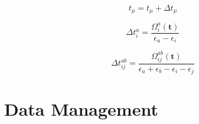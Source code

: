 \begin{equation}
  t_\mu = t_\mu + \Delta t_\mu
\end{equation}

\begin{equation}
  \Delta t_i^a = \frac{\Omega_i^a(\mathbf{t})}{\epsilon_a - \epsilon_i}
\end{equation}

\begin{equation}
  \Delta t_{ij}^{ab} = \frac{\Omega_{ij}^{ab}(\mathbf{t})}
  {\epsilon_a + \epsilon_b - \epsilon_i - \epsilon_j}
\end{equation}

\newpage
\section{Data Management}

